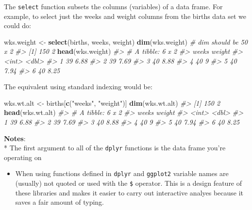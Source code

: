 \documentclass[]{book}
\newenvironment{Shaded}{\begin{snugshade}}{\end{snugshade}}
\newcommand{\CommentTok}[1]{\textcolor[rgb]{0.56,0.35,0.01}{\textit{#1}}}
\newcommand{\KeywordTok}[1]{\textcolor[rgb]{0.13,0.29,0.53}{\textbf{#1}}}
\newcommand{\NormalTok}[1]{#1}
\newcommand{\StringTok}[1]{\textcolor[rgb]{0.31,0.60,0.02}{#1}}
\providecommand{\tightlist}{%
  \setlength{\itemsep}{0pt}\setlength{\parskip}{0pt}}
\theoremstyle{definition}
\theoremstyle{definition}
\theoremstyle{definition}
\theoremstyle{remark}
\begin{document}
The \texttt{select} function subsets the columns (variables) of a data
frame. For example, to select just the weeks and weight columns from the
births data set we could do:

\begin{Shaded}
\begin{Highlighting}[]
\NormalTok{wks.weight <-}\StringTok{ }\KeywordTok{select}\NormalTok{(births, weeks, weight)}
\KeywordTok{dim}\NormalTok{(wks.weight)  }\CommentTok{# dim should be 50 x 2}
\CommentTok{#> [1] 150   2}
\KeywordTok{head}\NormalTok{(wks.weight)}
\CommentTok{#> # A tibble: 6 x 2}
\CommentTok{#>   weeks weight}
\CommentTok{#>   <int>  <dbl>}
\CommentTok{#> 1    39   6.88}
\CommentTok{#> 2    39   7.69}
\CommentTok{#> 3    40   8.88}
\CommentTok{#> 4    40   9   }
\CommentTok{#> 5    40   7.94}
\CommentTok{#> 6    40   8.25}
\end{Highlighting}
\end{Shaded}

The equivalent using standard indexing would be:

\begin{Shaded}
\begin{Highlighting}[]
\NormalTok{wks.wt.alt <-}\StringTok{ }\NormalTok{births[}\KeywordTok{c}\NormalTok{(}\StringTok{"weeks"}\NormalTok{, }\StringTok{"weight"}\NormalTok{)]}
\KeywordTok{dim}\NormalTok{(wks.wt.alt)}
\CommentTok{#> [1] 150   2}
\KeywordTok{head}\NormalTok{(wks.wt.alt)}
\CommentTok{#> # A tibble: 6 x 2}
\CommentTok{#>   weeks weight}
\CommentTok{#>   <int>  <dbl>}
\CommentTok{#> 1    39   6.88}
\CommentTok{#> 2    39   7.69}
\CommentTok{#> 3    40   8.88}
\CommentTok{#> 4    40   9   }
\CommentTok{#> 5    40   7.94}
\CommentTok{#> 6    40   8.25}
\end{Highlighting}
\end{Shaded}

\textbf{Notes}:\\
* The first argument to all of the \texttt{dplyr} functions is the data
frame you're operating on

\begin{itemize}
\tightlist
\item
  When using functions defined in \texttt{dplyr} and \texttt{ggplot2}
  variable names are (usually) not quoted or used with the \texttt{\$}
  operator. This is a design feature of these libraries and makes it
  easier to carry out interactive analyes because it saves a fair amount
  of typing.
\end{itemize}
\end{document}
